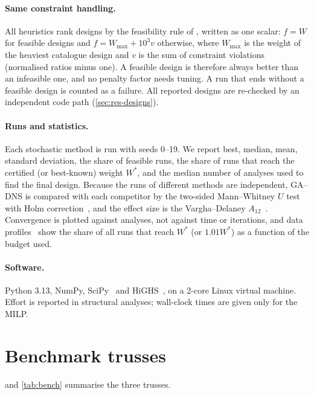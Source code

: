 \documentclass[lineno,pdflatex,sn-mathphys-num]{sn-jnl}
\begin{document}
\paragraph{Same constraint handling.} All heuristics rank designs by the
feasibility rule of \citet{Deb2000}, written as one scalar: $f=W$ for feasible
designs and $f=W_{\max}+10^3 v$ otherwise, where $W_{\max}$ is the weight of
the heaviest catalogue design and $v$ is the sum of constraint violations
(normalised ratios minus one). A feasible design is therefore always better than
an infeasible one, and no penalty factor needs tuning. A run that ends without
a feasible design is counted as a failure. All reported designs
are re-checked by an independent code path (\cref{sec:res-designs}).

\paragraph{Runs and statistics.} Each stochastic method is run with seeds
0--19. We report best, median, mean, standard deviation, the share of
feasible runs, the share of runs
that reach the certified (or best-known) weight $W^\ast$, and the median number
of analyses used to find the final design. Because the runs of different
methods are independent, GA--DNS is compared with each competitor by the
two-sided Mann--Whitney $U$ test~\citep{Mann1947} with Holm
correction~\citep{Holm1979}, and the effect size is the Vargha--Delaney
$A_{12}$~\citep{Vargha2000}. Convergence is plotted against analyses, not
against time or iterations, and data profiles~\citep{More2009} show the
share of all runs that reach $W^\ast$ (or $1.01W^\ast$) as a function of the
budget used.

\paragraph{Software.} Python 3.13, NumPy, SciPy~\citep{Virtanen2020} and
HiGHS~\citep{Huangfu2018}, on a 2-core Linux virtual machine. Effort is reported in structural analyses; wall-clock times are given only for the MILP.

\section{Benchmark trusses}
\label{sec:benchmarks}

 and \cref{tab:bench} summarise the three trusses.
\end{document}

